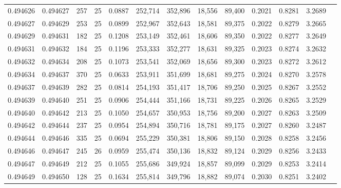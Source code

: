 \begin{tabular}{rrrrrrrrrrrrr}
0.494626 & 0.494627 &   257 &  25 &                                     0.0887 & 252,714 & 352,896 &  18,556 &  89,400 & 0.2021 & 0.8281 & 3.2689 \\
0.494627 & 0.494629 &   253 &  25 &                                     0.0899 & 252,967 & 352,643 &  18,581 &  89,375 & 0.2022 & 0.8279 & 3.2665 \\
0.494629 & 0.494631 &   182 &  25 &                                     0.1208 & 253,149 & 352,461 &  18,606 &  89,350 & 0.2022 & 0.8277 & 3.2649 \\
0.494631 & 0.494632 &   184 &  25 &                                     0.1196 & 253,333 & 352,277 &  18,631 &  89,325 & 0.2023 & 0.8274 & 3.2632 \\
0.494632 & 0.494634 &   208 &  25 &                                     0.1073 & 253,541 & 352,069 &  18,656 &  89,300 & 0.2023 & 0.8272 & 3.2612 \\
0.494634 & 0.494637 &   370 &  25 &                                     0.0633 & 253,911 & 351,699 &  18,681 &  89,275 & 0.2024 & 0.8270 & 3.2578 \\
0.494637 & 0.494639 &   282 &  25 &                                     0.0814 & 254,193 & 351,417 &  18,706 &  89,250 & 0.2025 & 0.8267 & 3.2552 \\
0.494639 & 0.494640 &   251 &  25 &                                     0.0906 & 254,444 & 351,166 &  18,731 &  89,225 & 0.2026 & 0.8265 & 3.2529 \\
0.494640 & 0.494642 &   213 &  25 &                                     0.1050 & 254,657 & 350,953 &  18,756 &  89,200 & 0.2027 & 0.8263 & 3.2509 \\
0.494642 & 0.494644 &   237 &  25 &                                     0.0954 & 254,894 & 350,716 &  18,781 &  89,175 & 0.2027 & 0.8260 & 3.2487 \\
0.494644 & 0.494646 &   335 &  25 &                                     0.0694 & 255,229 & 350,381 &  18,806 &  89,150 & 0.2028 & 0.8258 & 3.2456 \\
0.494646 & 0.494647 &   245 &  26 &                                     0.0959 & 255,474 & 350,136 &  18,832 &  89,124 & 0.2029 & 0.8256 & 3.2433 \\
0.494647 & 0.494649 &   212 &  25 &                                     0.1055 & 255,686 & 349,924 &  18,857 &  89,099 & 0.2029 & 0.8253 & 3.2414 \\
0.494649 & 0.494650 &   128 &  25 &                                     0.1634 & 255,814 & 349,796 &  18,882 &  89,074 & 0.2030 & 0.8251 & 3.2402 \\

\end{tabular}
